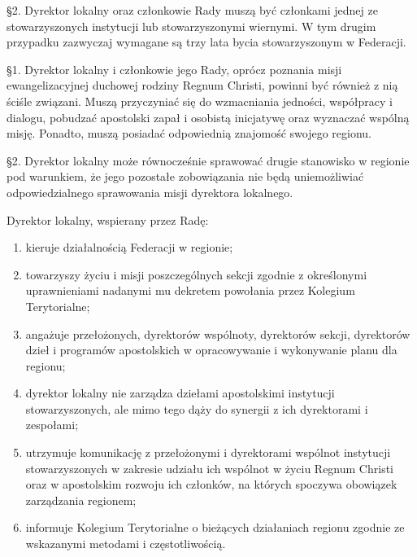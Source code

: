 \S{}2. Dyrektor lokalny oraz członkowie Rady muszą być członkami jednej ze stowarzyszonych instytucji lub stowarzyszonymi wiernymi. W tym drugim przypadku zazwyczaj wymagane są trzy lata bycia stowarzyszonym w Federacji.


 \S{}1. Dyrektor lokalny i członkowie jego Rady, oprócz poznania misji ewangelizacyjnej duchowej rodziny Regnum Christi, powinni być również z nią ściśle związani. Muszą przyczyniać się do wzmacniania jedności, współpracy i dialogu, pobudzać apostolski zapał i osobistą inicjatywę oraz wyznaczać wspólną misję. Ponadto, muszą posiadać odpowiednią znajomość swojego regionu.

\S{}2. Dyrektor lokalny może równocześnie sprawować drugie stanowisko w regionie pod warunkiem, że jego pozostałe zobowiązania nie będą uniemożliwiać odpowiedzialnego sprawowania misji dyrektora lokalnego.

\filbreak{}

 Dyrektor lokalny, wspierany przez Radę:
\begin{enumerate}
	
	\item kieruje działalnością Federacji w regionie;
	
	\item towarzyszy życiu i misji poszczególnych sekcji zgodnie z określonymi uprawnieniami nadanymi mu dekretem powołania przez Kolegium Terytorialne;
	
	\item angażuje przełożonych, dyrektorów wspólnoty, dyrektorów sekcji, dyrektorów dzieł i programów apostolskich w opracowywanie i wykonywanie planu dla regionu;
	
	\item dyrektor lokalny nie zarządza dziełami apostolskimi instytucji stowarzyszonych, ale mimo tego dąży do synergii z ich dyrektorami i zespołami;
	
	\item utrzymuje komunikację z przełożonymi i dyrektorami wspólnot instytucji stowarzyszonych w zakresie udziału ich wspólnot w życiu Regnum Christi oraz w apostolskim rozwoju ich członków, na których spoczywa obowiązek zarządzania regionem;
	
	\item informuje Kolegium Terytorialne o bieżących działaniach regionu zgodnie ze wskazanymi metodami i częstotliwością.
\end{enumerate}

